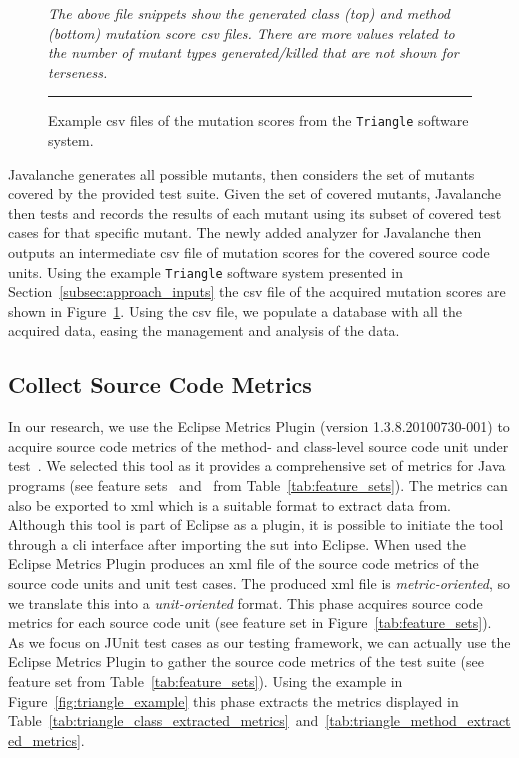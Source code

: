 \begin{figure}[!tb]
  \centering
  
  
  \caption{Example \gls{csv} files of the mutation scores from the \texttt{Triangle} software system.}
  \vspace{1mm}
  \footnotesize{\emph{The above file snippets show the generated class (top) and method (bottom) mutation score \gls{csv} files. There are more values related to the number of mutant types generated/killed that are not shown for terseness.}}
  \vspace{2mm}
  \hrule
  \label{fig:triangle_mutation_scores}
\end{figure}

Javalanche generates all possible mutants, then considers the set of mutants covered by the provided test suite. Given the set of covered mutants, Javalanche then tests and records the results of each mutant using its subset of covered test cases for that specific mutant. The newly added analyzer for Javalanche then outputs an intermediate \gls{csv} file of mutation scores for the covered source code units. Using the example \texttt{Triangle} software system presented in Section~\ref{subsec:approach_inputs} the \gls{csv} file of the acquired mutation scores are shown in Figure~\ref{fig:triangle_mutation_scores}. Using the \gls{csv} file, we populate a database with all the acquired data, easing the management and analysis of the data.


\subsection{Collect Source Code Metrics}
\label{subsec:approach_collect_source_metrics}
In our research, we use the Eclipse Metrics Plugin (version 1.3.8.20100730-001) to acquire source code metrics of the method- and class-level source code unit under test~\cite{Metrics}. We selected this tool as it provides a comprehensive set of metrics for Java programs (see feature sets ~and~ from Table~\ref{tab:feature_sets}). The metrics can also be exported to \gls{xml} which is a suitable format to extract data from. Although this tool is part of Eclipse as a plugin, it is possible to initiate the tool through a \gls{cli} interface after importing the \gls{sut} into Eclipse. When used the Eclipse Metrics Plugin produces an \gls{xml} file of the source code metrics of the source code units and unit test cases. The produced \gls{xml} file is \emph{metric-oriented}, so we translate this into a \emph{unit-oriented} format. This phase acquires source code metrics for each source code unit (see feature set  in Figure~\ref{tab:feature_sets}). As we focus on JUnit test cases as our testing framework, we can actually use the Eclipse Metrics Plugin to gather the source code metrics of the test suite (see feature set  from Table~\ref{tab:feature_sets}). Using the example in Figure~\ref{fig:triangle_example} this phase extracts the metrics displayed in Table~\ref{tab:triangle_class_extracted_metrics}~and~\ref{tab:triangle_method_extracted_metrics}.

